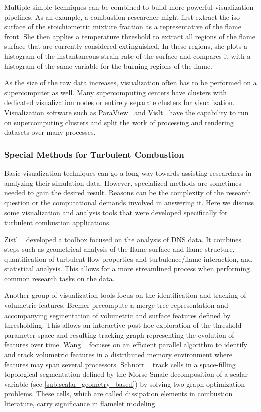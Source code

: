 %
Multiple simple techniques can be combined to build more powerful visualization
pipelines.
%
As an example, a combustion researcher might first extract the iso-surface of
the stoichiometric mixture fraction as a representative of the flame front.
%
She then applies a temperature threshold to extract all regions of the flame
surface that are currently considered extinguished.
%
In these regions, she plots a histogram of the instantaneous strain rate of the
surface and compares it with a histogram of the same variable for the burning
regions of the flame.
%

%
As the size of the raw data increases, visualization often has to be performed
on a supercomputer as well.
%
Many supercomputing centers have clusters with dedicated visualization nodes or
entirely separate clusters for visualization.
%
Visualization software such as ParaView~\cite{Ahrens2005} and
VisIt~\cite{HPV:VisIt} have the capability to run on supercomputing clusters
and split the work of processing and rendering datasets over many processes.
%
%
\subsubsection{Special Methods for Turbulent Combustion} %
\label{ssub:special_methods_for_turbulent_combustion}
%
Basic visualization techniques can go a long way towards assisting researchers
in analyzing their simulation data.
%
However, specialized methods are sometimes needed to gain the desired result.
%
Reasons can be the complexity of the research question or the computational
demands involved in answering it.
%
Here we discuss some visualization and analysis tools that were developed
specifically for turbulent combustion applications.
%

%
Zistl \etal~\cite{Zistl2009} developed a toolbox focused on the analysis of
\ac{DNS} data.
%
It combines steps such as geometrical analysis of the flame surface and flame
structure, quantification of turbulent flow properties and turbulence/flame
interaction, and statistical analysis.
%
This allows for a more streamlined process when performing common research
tasks on the data.
%

%
Another group of visualization tools focus on the identification and tracking of
volumetric features.
%
Bremer \etal precompute a merge-tree representation and accompanying
segmentation of volumetric \cite{Bremer2009,Bremer2011} and surface features
\cite{Bremer2010} defined by thresholding.
%
This allows an interactive post-hoc exploration of the threshold parameter
space and resulting tracking graph representing the evolution of features over
time.
%
Wang \etal~\cite{Wang2013} focuses on an efficient parallel algorithm to
identify and track volumetric features in a distributed memory environment
where features may span several processors.
%
Schnorr \etal~\cite{Schnorr2018} track cells in a space-filling topological
segmentation defined by the Morse-Smale decomposition of a scalar variable (see
\cref{sub:scalar_geometry_based}) by solving two graph optimization problems.
%
These cells, which are called dissipation elements in combustion literature,
carry significance in flamelet modeling.
%

